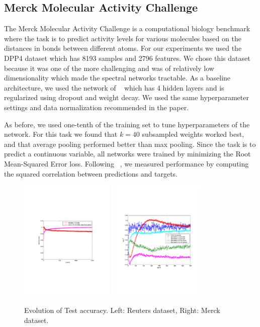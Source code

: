 \subsection{Merck Molecular Activity Challenge}

The Merck Molecular Activity Challenge is a computational biology benchmark where the task is to predict activity levels for various molecules based on the distances in bonds between different atoms. For our experiments we used the DPP4 dataset which has 8193 samples and 2796 features. We chose this dataset because it was one of the more challenging and was of relatively low dimensionality which made the spectral networks tractable. As a baseline architecture, we used the network of ~\cite{Ma:JournalChem2015} which has 4 hidden layers and is regularized using dropout and weight decay. We used the same hyperparameter settings and data normalization recommended in the paper.   

As before, we used one-tenth of the training set to tune hyperparameters of the network. For this task we found that $k=40$ subsampled weights worked best, and that average pooling performed better than max pooling. Since the task is to predict a continuous variable, all networks were trained by minimizing the Root Mean-Squared Error loss. Following ~\cite{Ma:JournalChem2015}, we measured performance by computing the squared correlation between predictions and targets.

\begin{figure}[h]
\begin{center}
\includegraphics[width=0.4\textwidth]{reuterscrop.pdf}~
\includegraphics[width=0.4\textwidth]{merckcrop.pdf}
\caption{Evolution of Test accuracy. Left: Reuters dataset, Right: Merck dataset.}
\end{center}
\end{figure}
\label{merckfigure}


